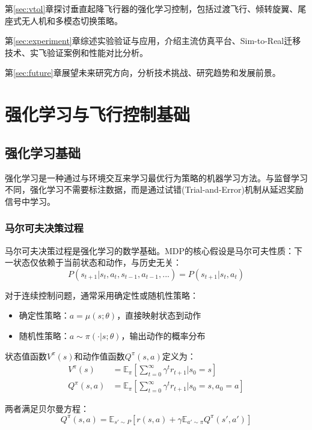 \documentclass[12pt,a4paper]{ctexart}
\begin{document}
第\ref{sec:vtol}章探讨垂直起降飞行器的强化学习控制，包括过渡飞行、倾转旋翼、尾座式无人机和多模态切换策略。

第\ref{sec:experiment}章综述实验验证与应用，介绍主流仿真平台、Sim-to-Real迁移技术、实飞验证案例和性能对比分析。

第\ref{sec:future}章展望未来研究方向，分析技术挑战、研究趋势和发展前景。

\section{强化学习与飞行控制基础}\label{sec:background}
\subsection{强化学习基础}

强化学习是一种通过与环境交互来学习最优行为策略的机器学习方法。与监督学习不同，强化学习不需要标注数据，而是通过试错(Trial-and-Error)机制从延迟奖励信号中学习。

\subsubsection{马尔可夫决策过程}

马尔可夫决策过程是强化学习的数学基础。MDP的核心假设是马尔可夫性质：下一状态仅依赖于当前状态和动作，与历史无关：
\begin{equation}
    P(s_{t+1}|s_t, a_t, s_{t-1}, a_{t-1}, ...) = P(s_{t+1}|s_t, a_t)
\end{equation}

对于连续控制问题，通常采用确定性或随机性策略：
\begin{itemize}
    \item 确定性策略：$a = \mu(s; \theta)$，直接映射状态到动作
    \item 随机性策略：$a \sim \pi(\cdot|s; \theta)$，输出动作的概率分布
\end{itemize}

状态值函数$V^\pi(s)$和动作值函数$Q^\pi(s,a)$定义为：
\begin{align}
    V^\pi(s) &= \mathbb{E}_{\pi}\left[\sum_{t=0}^{\infty} \gamma^t r_{t+1} | s_0 = s\right] \\
    Q^\pi(s,a) &= \mathbb{E}_{\pi}\left[\sum_{t=0}^{\infty} \gamma^t r_{t+1} | s_0 = s, a_0 = a\right]
\end{align}

两者满足贝尔曼方程：
\begin{equation}
    Q^\pi(s,a) = \mathbb{E}_{s' \sim P}[r(s,a) + \gamma \mathbb{E}_{a' \sim \pi}Q^\pi(s',a')]
\end{equation}
\end{document}
